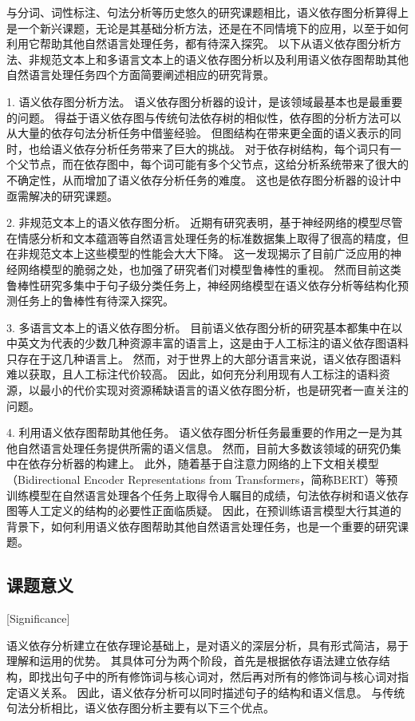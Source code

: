 与分词、词性标注、句法分析等历史悠久的研究课题相比，语义依存图分析算得上是一个新兴课题，无论是其基础分析方法，还是在不同情境下的应用，以至于如何利用它帮助其他自然语言处理任务，都有待深入探究。
以下从语义依存图分析方法、非规范文本上和多语言文本上的语义依存图分析以及利用语义依存图帮助其他自然语言处理任务四个方面简要阐述相应的研究背景。

1. 语义依存图分析方法。
语义依存图分析器的设计，是该领域最基本也是最重要的问题。
得益于语义依存图与传统句法依存树的相似性，依存图的分析方法可以从大量的依存句法分析任务中借鉴经验。
但图结构在带来更全面的语义表示的同时，也给语义依存分析任务带来了巨大的挑战。
对于依存树结构，每个词只有一个父节点，而在依存图中，每个词可能有多个父节点，这给分析系统带来了很大的不确定性，从而增加了语义依存分析任务的难度。
这也是依存图分析器的设计中亟需解决的研究课题。

2. 非规范文本上的语义依存图分析。
近期有研究表明，基于神经网络的模型尽管在情感分析\cite{zhang-etal-2019-generating}和文本蕴涵\cite{jin-etal-2020-isbert}等自然语言处理任务的标准数据集上取得了很高的精度，但在非规范文本上这些模型的性能会大大下降。
这一发现揭示了目前广泛应用的神经网络模型的脆弱之处，也加强了研究者们对模型鲁棒性的重视。
然而目前这类鲁棒性研究多集中于句子级分类任务上，神经网络模型在语义依存分析等结构化预测任务上的鲁棒性有待深入探究。

3. 多语言文本上的语义依存图分析。
目前语义依存图分析的研究基本都集中在以中英文为代表的少数几种资源丰富的语言上，这是由于人工标注的语义依存图语料只存在于这几种语言上。
然而，对于世界上的大部分语言来说，语义依存图语料难以获取，且人工标注代价较高。
因此，如何充分利用现有人工标注的语料资源，以最小的代价实现对资源稀缺语言的语义依存图分析，也是研究者一直关注的问题。

4. 利用语义依存图帮助其他任务。
语义依存图分析任务最重要的作用之一是为其他自然语言处理任务提供所需的语义信息。
然而，目前大多数该领域的研究仍集中在依存分析器的构建上。
此外，随着基于自注意力网络的上下文相关模型（Bidirectional Encoder Representations from Transformers，简称BERT）\cite{devlin-etal-2018-bert}等预训练模型在自然语言处理各个任务上取得令人瞩目的成绩，句法依存树和语义依存图等人工定义的结构的必要性正面临质疑。
因此，在预训练语言模型大行其道的背景下，如何利用语义依存图帮助其他自然语言处理任务，也是一个重要的研究课题。


\subsection{课题意义}[Significance]

语义依存分析建立在依存理论基础上，是对语义的深层分析，具有形式简洁，易于理解和运用的优势。
其具体可分为两个阶段，首先是根据依存语法建立依存结构，即找出句子中的所有修饰词与核心词对，然后再对所有的修饰词与核心词对指定语义关系。
因此，语义依存分析可以同时描述句子的结构和语义信息。
与传统句法分析相比，语义依存图分析主要有以下三个优点。


